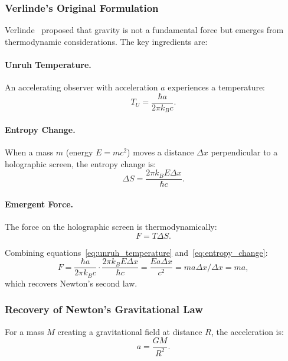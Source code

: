 \subsubsection{Verlinde's Original Formulation}

Verlinde~\cite{Verlinde2011} proposed that gravity is not a fundamental force but emerges from thermodynamic considerations. The key ingredients are:

\paragraph{Unruh Temperature.}
An accelerating observer with acceleration $a$ experiences a temperature:
\begin{equation}
T_U = \frac{\hbar a}{2\pi k_B c}.
\label{eq:unruh_temperature}
\end{equation}

\paragraph{Entropy Change.}
When a mass $m$ (energy $E = mc^2$) moves a distance $\Delta x$ perpendicular to a holographic screen, the entropy change is:
\begin{equation}
\Delta S = \frac{2\pi k_B E \Delta x}{\hbar c}.
\label{eq:entropy_change}
\end{equation}

\paragraph{Emergent Force.}
The force on the holographic screen is thermodynamically:
\begin{equation}
F = T \Delta S.
\label{eq:thermodynamic_force}
\end{equation}

Combining equations~\eqref{eq:unruh_temperature} and~\eqref{eq:entropy_change}:
\begin{equation}
F = \frac{\hbar a}{2\pi k_B c} \cdot \frac{2\pi k_B E \Delta x}{\hbar c} = \frac{E a \Delta x}{c^2} = m a \Delta x / \Delta x = ma,
\end{equation}
which recovers Newton's second law.

\subsubsection{Recovery of Newton's Gravitational Law}

For a mass $M$ creating a gravitational field at distance $R$, the acceleration is:
\begin{equation}
a = \frac{GM}{R^2}.
\end{equation}

